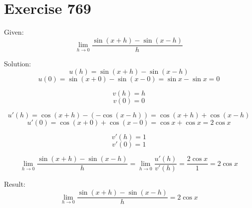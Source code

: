 \documentclass[a4paper, 10pt]{scrartcl}
\begin{document}
\section{Exercise 769}

Given:
\[\lim_{h\to 0}{\frac{\sin{(x + h)} - \sin{(x - h)}}{h}}\]

Solution:
\[u(h) = \sin{(x + h)} - \sin{(x - h)}\]
\[u(0) = \sin{(x + 0)} - \sin{(x - 0)} = \sin{x} - \sin{x} = 0\]

\[v(h) = h\]
\[v(0) = 0\]

\[u'(h) = \cos{(x + h)} - (-\cos{(x - h)}) = \cos{(x + h)} + \cos{(x - h)}\]
\[u'(0) = \cos{(x + 0)} + \cos{(x - 0)} = \cos{x} + \cos{x} = 2\cos{x}\]

\[v'(h) = 1\]
\[v'(0) = 1\]

\[\lim_{h\to 0}{\frac{\sin{(x + h)} - \sin{(x - h)}}{h}} = \lim_{h\to 0}{\frac{u'(h)}{v'(h)}} =
\frac{2\cos{x}}{1} = 2\cos{x}\]

Result:
\[\lim_{h\to 0}{\frac{\sin{(x + h)} - \sin{(x - h)}}{h}} = 2\cos{x}\]
\end{document}
